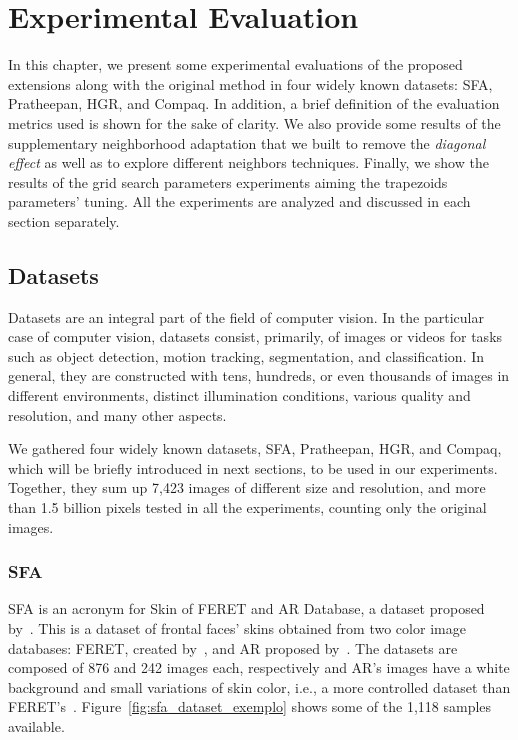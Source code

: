 \chapter{Experimental Evaluation}
\label{cap:experimentos}

In this chapter, we present some experimental evaluations of the proposed extensions along with the original method in four widely known datasets: SFA, Pratheepan, HGR, and Compaq. In addition, a brief definition of the evaluation metrics used is shown for the sake of clarity. We also provide some results of the supplementary neighborhood adaptation that we built to remove the \emph{diagonal effect} as well as to explore different neighbors techniques. Finally, we show the results of the grid search parameters experiments aiming the trapezoids parameters' tuning. All the experiments are analyzed and discussed in each section separately.


\section{Datasets}
\label{sec:datasets}
Datasets are an integral part of the field of computer vision. In the particular case of computer vision, datasets consist, primarily, of images or videos for tasks such as object detection, motion tracking, segmentation, and classification. In general, they are constructed with tens, hundreds, or even thousands of images in different environments, distinct illumination conditions, various quality and resolution, and many other aspects.

We gathered four widely known datasets, SFA, Pratheepan, HGR, and Compaq, which will be briefly introduced in next sections, to be used in our experiments. Together, they sum up 7,423 images of different size and resolution, and more than 1.5 billion pixels tested in all the experiments, counting only the original images.


\subsection{SFA}
\label{sec:datasets_sfa}
SFA is an acronym for Skin of FERET and AR Database, a dataset proposed by~\citet{sfa-skin-dataset:13}. This is a dataset of frontal faces' skins obtained from two color image databases: FERET, created by~\citet{feret:96}, and AR proposed by~\citet{ar-face-database:98}. The datasets are composed of 876 and 242 images each, respectively and AR's images have a white background and small variations of skin color, i.e., a more controlled dataset than FERET's~\citep{sfa-skin-dataset:13}. Figure~\ref{fig:sfa_dataset_exemplo} shows some of the 1,118 samples available.

